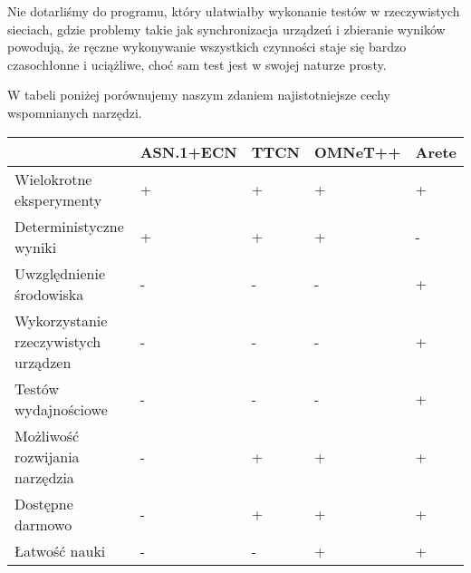 \documentclass[00-praca-magisterska.tex]{subfiles}
\begin{document}
Nie dotarliśmy do programu, który ułatwiałby wykonanie testów w
rzeczywistych sieciach, gdzie problemy takie jak synchronizacja urządzeń i
zbieranie wyników powodują, że ręczne wykonywanie wszystkich czynności staje
się bardzo czasochłonne i uciążliwe, choć sam test jest w swojej naturze prosty.

W tabeli poniżej porównujemy naszym zdaniem najistotniejsze cechy wspomnianych
narzędzi.

\begin{small}
\begin{center}
   \begin{tabular}{   p{3cm} || p{1.8cm} | p{1.8cm} | p{1.8cm} | p{1.8cm}   }
      \hline
      & \small{ASN.1+ECN} & \small{TTCN} & \small{OMNeT++} & \small{Arete} \\
      \hline
      Wielokrotne eksperymenty & + & + & + & + \\
      \hline
      Deterministyczne wyniki & + & + & + & - \\
      \hline
      Uwzględnienie środowiska & - & - & - & + \\
      \hline
      Wykorzystanie rzeczywistych urządzen & - & - & - & + \\
      \hline
      Testów wydajnościowe & - & - & - & + \\
      \hline
      Możliwość rozwijania narzędzia & - & + & + & + \\
      \hline
      Dostępne darmowo & - & + & + & + \\
      \hline
      Łatwość nauki & - & - & + & + \\
      \hline
  \end{tabular}
\end{center}
\end{small}

\end{document}
